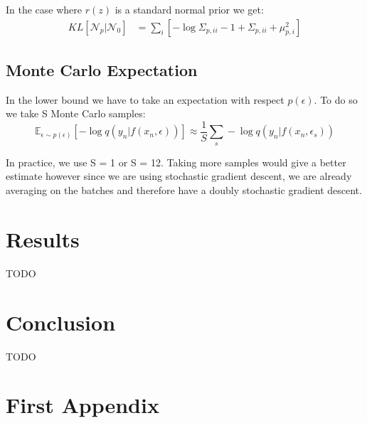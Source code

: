 \documentclass[10pt,oneside,openright]{report}
\begin{document}
In the case where $r(z)$ is a standard normal prior we get:
\begin{align}
KL[\mathcal{N}_p | \mathcal{N}_0] &= \sum_i[ -\log \Sigma_{p, ii} - 1 + \Sigma_{p, ii}+ \mu_{p, i}^2]
\end{align}

\section{Monte Carlo Expectation}

In the lower bound we have to take an expectation with respect $p(\epsilon)$. To do so we take S Monte Carlo samples: 
 $$ \mathbb{E}_{\epsilon \sim p(\epsilon)}[- \log q(y_{n} |f(x_{n}, \epsilon))] \approx \frac{1}{S}\sum_s - \log q(y_{n} |f(x_{n}, \epsilon_s)) $$
 
 In practice, we use S = 1 or S = 12. Taking more samples would give a better estimate however since we are using stochastic gradient descent, we are already averaging on the batches and therefore have a doubly stochastic gradient descent.

\chapter{Results}
TODO

\chapter{Conclusion}
TODO

\appendix
\chapter{First Appendix}
\end{document}
